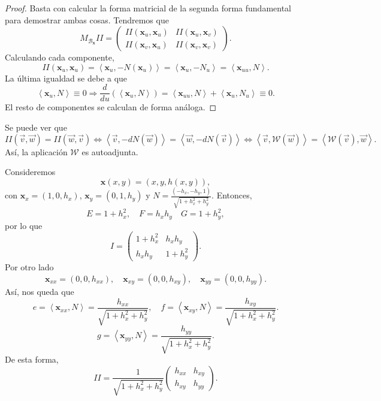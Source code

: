 \begin{proof}
	Basta con calcular la forma matricial de la segunda forma fundamental para demostrar ambas cosas.
Tendremos que 
\[M_{ \mathcal{B}_{ \textbf{x} }}II = \begin{pmatrix} II\left( \textbf{x} _{u}, \textbf{x} _{u}\right) & II\left( \textbf{x} _{u}, \textbf{x} _{v}\right) \\
II\left( \textbf{x} _{v}, \textbf{x} _{u}\right) & II\left( \textbf{x} _{v}, \textbf{x} _{v}\right)\end{pmatrix} .\]
Calculando cada componente,
\[II\left( \textbf{x} _{u}, \textbf{x} _{u}\right)=\left\langle \textbf{x} _{u}, -N\left( \textbf{x} _{u}\right) \right\rangle  = \left\langle \textbf{x} _{u}, -N_{u} \right\rangle = \left\langle \textbf{x} _{uu}, N \right\rangle  .\]
La última igualdad se debe a que
\[\left\langle \textbf{x} _{u}, N \right\rangle \equiv 0 \Rightarrow \frac{d}{du}\left(\left\langle \textbf{x} _{u}, N \right\rangle \right)=\left\langle \textbf{x} _{uu}, N \right\rangle + \left\langle \textbf{x} _{u}, N_{u} \right\rangle \equiv 0.\]
El resto de componentes se calculan de forma análoga.
\end{proof}
\begin{observation}
	Se puede ver que 
	\[II\left(\vec{v}, \vec{w}\right)=II\left(\vec{w}, \vec{v}\right)\iff \left\langle \vec{v}, -dN\left(\vec{w}\right) \right\rangle = \left\langle \vec{w}, -dN\left(\vec{v}\right) \right\rangle \iff \left\langle \vec{v}, \mathcal{W}\left(\vec{w}\right) \right\rangle =\left\langle \mathcal{W}\left(\vec{v}\right), \vec{w} \right\rangle  .\]
Así, la aplicación $\displaystyle \mathcal{W} $ es autoadjunta.	
\end{observation}
\begin{eg}
Consideremos 
\[ \textbf{x} \left(x,y\right)=\left(x,y,h\left(x,y\right)\right) ,\]
con $\displaystyle \textbf{x} _{x}=\left(1, 0, h_{x}\right) $, $\displaystyle \textbf{x} _{y} = \left(0,1,h_{y}\right) $ y $\displaystyle N=\frac{\left(-h_{x}, -h_{y}, 1\right)}{\sqrt{1 + h_{x}^{2}+h_{y}^{2}}} $. Entonces, 
\[E = 1 + h_{x}^{2}, \quad F = h_{x}h_{y} \quad G=1+h_{y}^{2} ,\]
por lo que 
\[I = \begin{pmatrix} 1 + h_{x}^{2} & h_{x}h_{y} \\ h_{x}h_{y}& 1 + h_{y}^{2} \end{pmatrix} .\]
Por otro lado
\[ \textbf{x} _{x x} = \left(0,0, h_{x x}\right), \quad \textbf{x} _{xy} = \left(0,0,h_{xy}\right), \quad \textbf{x} _{yy}= \left(0,0,h_{yy}\right) .\]
Así, nos queda que 
\[ e = \left\langle \textbf{x} _{x x}, N \right\rangle =\frac{h_{x x}}{\sqrt{1+h_{x}^{2}+h_{y}^{2}}}, \quad f=\left\langle \textbf{x} _{xy}, N \right\rangle =\frac{h_{xy}}{\sqrt{1 + h_{x}^{2}+h_{y}^{2}}} .\]
\[g = \left\langle \textbf{x} _{yy}, N \right\rangle =\frac{h_{yy}}{\sqrt{1 + h_{x}^{2}+h_{y}^{2}}} .\]
De esta forma, 
\[II = \frac{1}{\sqrt{1 + h_{x}^{2}+h_{y}^{2}}}\begin{pmatrix} h_{x x} & h_{xy} \\ h_{xy} & h_{yy} \end{pmatrix} .\]
\end{eg}

